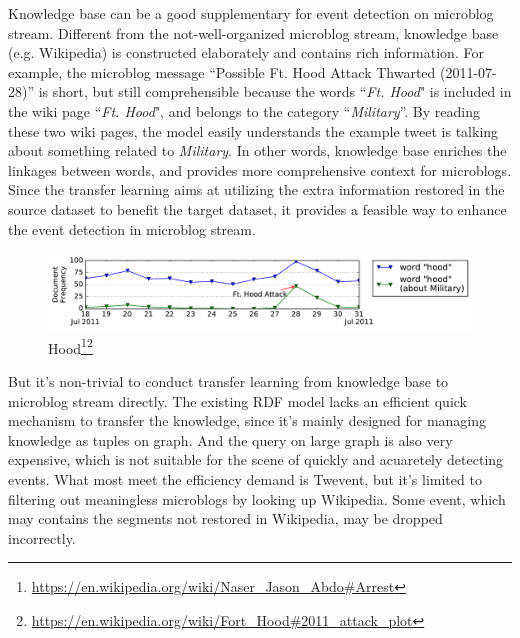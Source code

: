 \documentclass{article}
\begin{document}
Knowledge base can be a good supplementary for event detection on microblog stream.
Different from the not-well-organized microblog stream, knowledge base (e.g. Wikipedia) is constructed elaborately and contains rich information. 
For example, the microblog message ``Possible Ft. Hood Attack Thwarted (2011-07-28)'' is short, but still comprehensible because the words ``\textit{Ft. Hood}" is included in the wiki page ``\textit{Ft. Hood}", and belongs to the category ``\textit{Military}''.
By reading these two wiki pages, the model easily understands the example tweet is talking about something related to \textit{Military}.
In other words, knowledge base enriches the linkages between words, and provides more comprehensive context for microblogs.
Since the transfer learning\cite{pan2010survey} aims at utilizing the extra information restored in the source dataset to benefit the target dataset, it provides a feasible way to enhance the event detection in microblog stream.
\begin{figure}[h]
        \centering
        \includegraphics[width=1.0\columnwidth]{img/hood.pdf}
        \caption{Hood\footnote{\url{https://en.wikipedia.org/wiki/Naser_Jason_Abdo#Arrest}}\footnote{\url{https://en.wikipedia.org/wiki/Fort_Hood#2011_attack_plot}}}
        \label{fig:hood}
\end{figure}


But it's non-trivial to conduct transfer learning from knowledge base to microblog stream directly.
The existing RDF model\cite{klyne2006rdf} lacks an efficient quick mechanism to transfer the knowledge, since it's mainly designed for managing knowledge as tuples on graph. And the query on large graph is also very expensive\cite{huang2011scalable}, which is not suitable for the scene of quickly and acuaretely detecting events.
What most meet the efficiency demand is Twevent\cite{Twevent2012}, but it's limited to filtering out meaningless microblogs by looking up Wikipedia. Some event,  which may contains the segments not restored in Wikipedia, may be dropped incorrectly.
\end{document}
